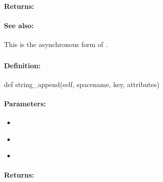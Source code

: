 \paragraph{Returns:}


\paragraph{See also:}  This is the asynchronous form of .

\pagebreak
\subsubsection{}
\label{api:python:string_append}


\paragraph{Definition:}
\begin{pythoncode}
def string_append(self, spacename, key, attributes)
\end{pythoncode}

\paragraph{Parameters:}
\begin{itemize}[noitemsep]
\item {}\\

\item {}\\

\item {}\\

\end{itemize}

\paragraph{Returns:}


\pagebreak
\subsubsection{}
\label{api:python:async_string_append}



